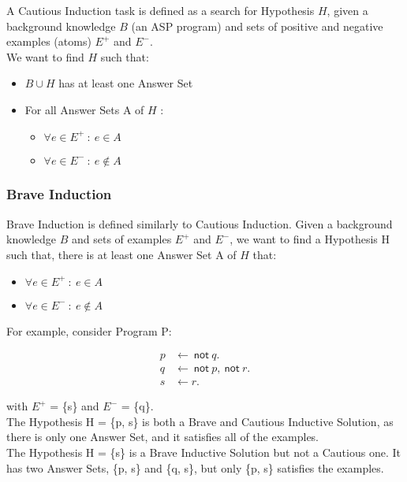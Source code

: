 A Cautious Induction task is defined as a search for Hypothesis $H$, given a background knowledge $B$ (an ASP program) and sets of positive and negative examples (atoms) $E^+$ and $E^-$. \\

We want to find $H$ such that:

\begin{itemize}
\item $B \cup H$ has at least one Answer Set
\item For all Answer Sets A of $H$ :
\begin{itemize}
\item $\forall e \in E^+ \: : \: e \in A$
\item $\forall e \in E^- \: : \: e \not \in A$
\end{itemize}
\end{itemize}

\subsubsection{Brave Induction}

Brave Induction is defined similarly to Cautious Induction. Given a background knowledge $B$ and sets of examples $E^+$ and $E^-$, we want to find a Hypothesis H such that, there is at least one Answer Set A of $H$ that:

\begin{itemize}
\item $\forall e \in E^+ \: : \: e \in A$
\item $\forall e \in E^- \: : \: e \not \in A$
\end{itemize}

For example, consider Program P:

\begin{align*}
p &\gets \: \textsf{not} \: q. \\
q &\gets \: \textsf{not} \: p, \: \textsf{not} \: r. \\
s &\gets r.
\end{align*}

with $E^+$ = \{s\} and $E^-$ = \{q\}. \\
The Hypothesis H = \{p, s\} is both a Brave and Cautious Inductive Solution, as there is only one Answer Set, and it satisfies all of the examples.\\

The Hypothesis H = \{s\} is a Brave Inductive Solution but not a Cautious one. It has two Answer Sets, \{p, s\} and \{q, s\}, but only \{p, s\} satisfies the examples.

